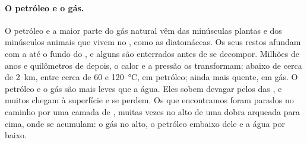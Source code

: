 \paragraph{O petróleo e o gás.} O petróleo e a maior parte do gás
natural vêm das minúsculas plantas e dos minúsculos animais que vivem no
, como as diatomáceas. Os seus restos afundam com a  até o fundo
do , e alguns são enterrados antes de se decompor. Milhões de anos e
quilômetros de  depois, o calor e a pressão os transformam:
abaixo de cerca de \qty{2}{km}, entre cerca de 60 e
\qty{120}{\degreeCelsius}, em petróleo; ainda mais quente, em gás. O
petróleo e o gás são mais leves que a água. Eles sobem devagar pelos
 das  , e muitos chegam à superfície e se perdem. Os
que encontramos foram parados no caminho por uma camada de 
, muitas vezes no alto de uma dobra arqueada para cima, onde
se acumulam: o gás no alto, o petróleo embaixo dele e a água por baixo.

